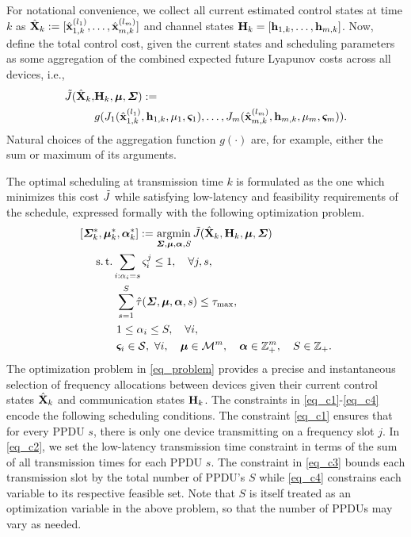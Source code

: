 For notational convenience, we collect all current estimated control states at time $k$ as ${\hat{\mathbf X} }_k := [{\hat{\mathbf x} }^{(l_1)}_{1,k}, \hdots, {\hat{\mathbf x} }^{(l_m)}_{m,k}]$ and channel states ${\mathbf H}_k = [{\mathbf h}_{1,k}, \hdots, {\mathbf h}_{m,k}]$. Now, define the total control cost, given the current states and scheduling parameters as some aggregation of the combined expected future Lyapunov costs across all devices, i.e.,
%
\begin{align}\label{eq_cost_total}
 \tdJ( \hbX_{k},&\bbH_{k}, \bbmu, \bbSigma) := \\
 &g(J_1(\hbx^{(l_1)}_{1,k},\bbh_{1,k},\mu_1,\bbsigma_1), \hdots, J_m(\hbx^{(l_m)}_{m,k},\bbh_{m,k},\mu_m,\bbsigma_m)). \nonumber
 \end{align}
 Natural choices of the aggregation function $g(\cdot)$ are, for example, either the sum or maximum of its arguments. 

The optimal scheduling at transmission time $k$ is formulated as the one which minimizes this cost ${\tilde J}$ while satisfying low-latency and feasibility requirements of the schedule, expressed formally with the following optimization problem.
%
\begin{align}\label{eq_problem}
[&\bbSigma_k^*, \bbmu_k^*,\bbalpha_k^*]  := \argmin_{\bbSigma, \bbmu, \bbalpha, S} \tdJ(\hbX_{k},\bbH_{k}, \bbmu, \bbSigma) \\
& \quad \st \sum_{i: \alpha_i = s} \varsigma_{i}^j \leq 1, \quad \forall j, s, \label{eq_c1} \\
& \qquad \quad \sum_{s=1}^S \hat{\tau}(\bbSigma, \bbmu, \bbalpha, s)  \leq \tau_{\max}, \label{eq_c2}\\
& \qquad \quad 1 \leq \alpha_i \leq S, \quad \forall i, \label{eq_c3}\\
& \qquad \quad \bbsigma_i \in \ccalS, \ \forall i, \quad \bbmu \in \ccalM^m, \quad \bbalpha \in \mathbb{Z}_+^m, \quad S \in \mathbb{Z}_+. \label{eq_c4}
\end{align}
%
The optimization problem in \eqref{eq_problem} provides a precise and instantaneous selection of frequency allocations between devices given their current control states ${\hat{\mathbf X} }_k$ and communication states ${\mathbf H}_k$. The constraints in \eqref{eq_c1}-\eqref{eq_c4} encode the following scheduling conditions. The constraint \eqref{eq_c1} ensures that for every PPDU $s$, there is only one device transmitting on a frequency slot $j$. In \eqref{eq_c2}, we set the low-latency transmission time constraint in terms of the sum of all transmission times for each PPDU $s$. The constraint in \eqref{eq_c3} bounds each transmission slot by the total number of PPDU's $S$ while \eqref{eq_c4} constrains each variable to its respective feasible set. Note that $S$ is itself treated as an optimization variable in the above problem, so that the number of PPDUs may vary as needed.


